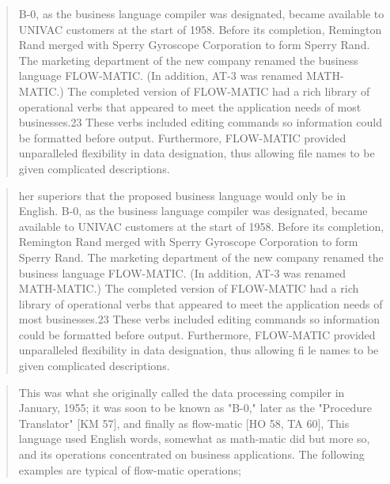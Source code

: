 
\begin{quotation}
  B-0, as the business language compiler was designated, became available to
  UNIVAC customers at the start of 1958. Before its completion, Remington Rand
  merged with Sperry Gyroscope Corporation to form Sperry Rand. The marketing
  department of the new company renamed the business language FLOW-MATIC. (In
  addition, AT-3 was renamed MATH-MATIC.) The completed version of
  FLOW-MATIC had
  a rich library of operational verbs that appeared to meet the application
  needs of most businesses.23 These verbs included editing commands so
  information could be formatted before output. Furthermore, FLOW-MATIC provided
  unparalleled flexibility in data designation, thus allowing file names to be
  given complicated descriptions.
\end{quotation}

\begin{quotation}
  her superiors that the proposed business language would only be in English.
  B-0, as the business language compiler was designated, became available to
  UNIVAC customers at the start of 1958. Before its completion, Remington Rand
  merged with Sperry Gyroscope Corporation to form Sperry Rand. The marketing
  department of the new company renamed the business language FLOW-MATIC. (In
  addition, AT-3 was renamed MATH-MATIC.) The completed version of
  FLOW-MATIC had
  a rich library of operational verbs that appeared to meet the application
  needs of most businesses.23 These verbs included editing commands so
  information could be formatted before output. Furthermore,
  FLOW-MATIC provided
  unparalleled flexibility in data designation, thus allowing fi le names to be
  given complicated descriptions.
\end{quotation}

\begin{quotation}
  This was what she originally called the data processing compiler in January,
  1955; it was soon to be known as "B-0," later as the "Procedure
  Translator" [KM 57], and finally as flow-matic [HO 58, TA 60], This language used English
  words, somewhat as math-matic did but more so, and its operations concentrated
  on business applications. The following examples are typical of flow-matic
  operations;
  \cite{history_of_computing_in_the_twentieth_century_1980}
\end{quotation}


